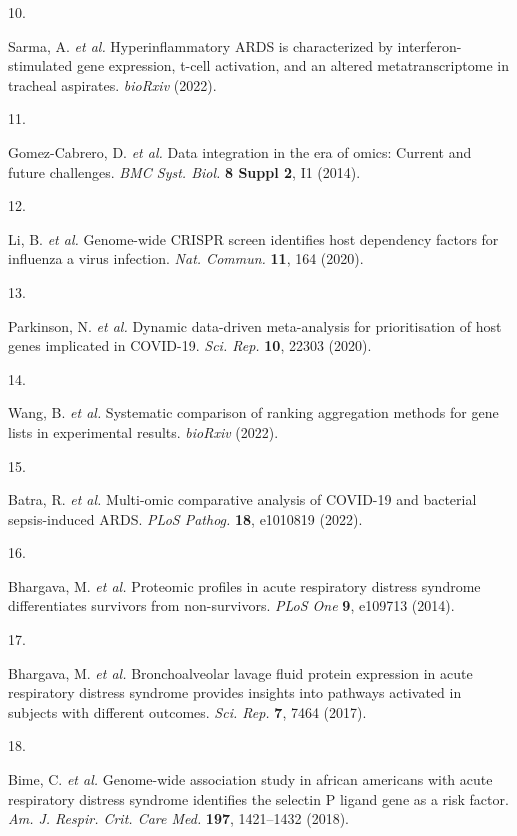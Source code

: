 \documentclass[
  11,
  a4paper,
]{article}
\newlength{\cslhangindent}
\newlength{\csllabelwidth}
\newlength{\cslentryspacingunit} %
\newenvironment{CSLReferences}[2] %
 {%
  \setlength{\parindent}{0pt}
  \ifodd #1
  \let\oldpar\par
  \def\par{\hangindent=\cslhangindent\oldpar}
  \fi
  \setlength{\parskip}{#2\cslentryspacingunit}
 }%
 {}
\newcommand{\CSLLeftMargin}[1]{\parbox[t]{\csllabelwidth}{#1}}
\newcommand{\CSLRightInline}[1]{\parbox[t]{\linewidth - \csllabelwidth}{#1}\break}
\begin{document}
\begin{CSLReferences}{0}{0}
\leavevmode{}%
\CSLLeftMargin{10. }%
\CSLRightInline{Sarma, A. \emph{et al.} Hyperinflammatory {ARDS} is
characterized by interferon-stimulated gene expression, t-cell
activation, and an altered metatranscriptome in tracheal aspirates.
\emph{bioRxiv} (2022).}

\leavevmode{}%
\CSLLeftMargin{11. }%
\CSLRightInline{Gomez-Cabrero, D. \emph{et al.} Data integration in the
era of omics: Current and future challenges. \emph{BMC Syst. Biol.}
\textbf{8 Suppl 2}, I1 (2014).}

\leavevmode{}%
\CSLLeftMargin{12. }%
\CSLRightInline{Li, B. \emph{et al.} Genome-wide {CRISPR} screen
identifies host dependency factors for influenza a virus infection.
\emph{Nat. Commun.} \textbf{11}, 164 (2020).}

\leavevmode{}%
\CSLLeftMargin{13. }%
\CSLRightInline{Parkinson, N. \emph{et al.} Dynamic data-driven
meta-analysis for prioritisation of host genes implicated in {COVID-19}.
\emph{Sci. Rep.} \textbf{10}, 22303 (2020).}

\leavevmode{}%
\CSLLeftMargin{14. }%
\CSLRightInline{Wang, B. \emph{et al.} Systematic comparison of ranking
aggregation methods for gene lists in experimental results.
\emph{bioRxiv} (2022).}

\leavevmode{}%
\CSLLeftMargin{15. }%
\CSLRightInline{Batra, R. \emph{et al.} Multi-omic comparative analysis
of {COVID-19} and bacterial sepsis-induced {ARDS}. \emph{PLoS Pathog.}
\textbf{18}, e1010819 (2022).}

\leavevmode{}%
\CSLLeftMargin{16. }%
\CSLRightInline{Bhargava, M. \emph{et al.} Proteomic profiles in acute
respiratory distress syndrome differentiates survivors from
non-survivors. \emph{PLoS One} \textbf{9}, e109713 (2014).}

\leavevmode{}%
\CSLLeftMargin{17. }%
\CSLRightInline{Bhargava, M. \emph{et al.} Bronchoalveolar lavage fluid
protein expression in acute respiratory distress syndrome provides
insights into pathways activated in subjects with different outcomes.
\emph{Sci. Rep.} \textbf{7}, 7464 (2017).}

\leavevmode{}%
\CSLLeftMargin{18. }%
\CSLRightInline{Bime, C. \emph{et al.} Genome-wide association study in
african americans with acute respiratory distress syndrome identifies
the selectin {P} ligand gene as a risk factor. \emph{Am. J. Respir.
Crit. Care Med.} \textbf{197}, 1421--1432 (2018).}


\end{CSLReferences}
\end{document}
